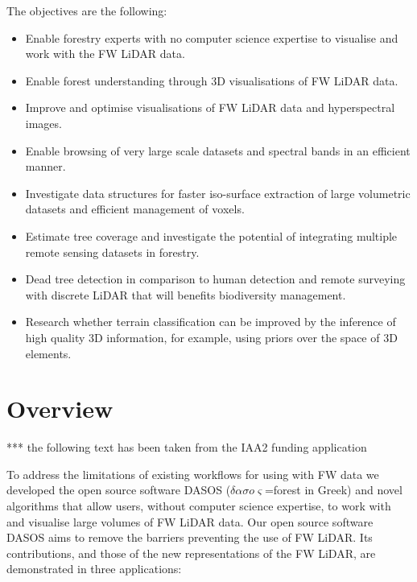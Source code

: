 \documentclass{subfiles}
\begin{document}
\par The objectives are the following:
\begin{itemize}
	\item Enable forestry experts with no computer science expertise to visualise and work with the FW LiDAR data. 
	\item Enable forest understanding through 3D visualisations of FW LiDAR data.
	\item Improve and optimise visualisations of FW LiDAR data and hyperspectral images.
	\item Enable browsing of very large scale datasets and spectral bands in an efficient manner.
	\item Investigate data structures for faster iso-surface extraction of large volumetric datasets and efficient management of voxels.
	\item Estimate tree coverage and investigate the potential of integrating multiple remote sensing datasets in forestry.
	\item Dead tree detection in comparison to human detection and remote surveying with discrete LiDAR that will benefits biodiversity management.
	\item Research whether terrain classification can be improved by the inference of high quality 3D information, for example, using priors over the space of 3D elements.
	
	
\end{itemize}

\section{Overview}

\par {\color{red} *** the following text has been taken from the IAA2 funding application}
	
\par To address the limitations of existing workflows for using with FW data we developed the open source software DASOS ($\delta \alpha \sigma o \varsigma$=forest in Greek) and novel algorithms that allow users, without computer science expertise, to work with and visualise large volumes of FW LiDAR data. Our open source software DASOS aims to remove the barriers preventing the use of FW LiDAR. Its contributions, and those of the new representations of the FW LiDAR, are demonstrated in three applications:
\end{document}
